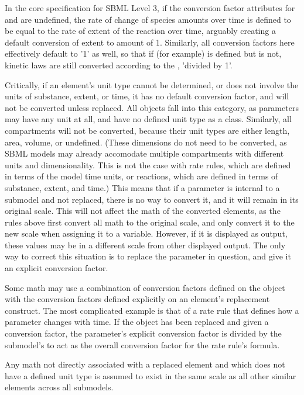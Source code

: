 In the core specification for SBML Level 3, if the conversion factor
attributes for \Model and \Species are undefined, the rate of change of
species amounts over time is defined to be equal to the rate of extent
of the reaction over time, arguably creating a default conversion of
extent to amount of 1.  Similarly, all conversion factors here
effectively default to '1' as well, so that if (for example)
 is defined but  is
not, kinetic laws are still
converted according to the , 'divided by 1'.

Critically, if an element's unit type cannot be determined, or does not
involve the units of substance, extent, or time, it has no
default conversion factor, and will not be converted unless replaced.
All \Parameter objects fall into this category, as
parameters may have any unit at all, and have no defined unit type as a
class.  Similarly, all compartments will not be converted, because their
unit types are either length, area, volume, or undefined.  (These dimensions
do not need to be converted, as SBML models may already accomodate multiple
compartments with different units and dimensionality.  This is not the case
with rate rules, which are defined in terms of the model time units, or
reactions, which are defined in terms of substance, extent, and time.)
This means that if a parameter is internal to
a submodel and not replaced, there is no way to convert it, and it will
remain in its original scale.  This will not affect the math of the
converted elements, as the rules above first convert all math to the
original scale, and only convert it to the new scale when assigning it
to a variable.  However, if it is displayed as output, these values may
be in a different scale from other displayed output.  The only way to
correct this situation is to replace the parameter in question, and give
it an explicit conversion factor.

Some math may use a combination of conversion factors defined on the
\Submodel object with the conversion factors defined explicitly on an
element's replacement construct.  The most complicated example is that of a rate
rule that defines how a parameter changes with time.  If the \Parameter
object has been replaced and given a conversion factor, the parameter's
explicit conversion factor is divided by the submodel's
 to act as the overall conversion factor for
the rate rule's formula.

Any math not directly associated with a replaced element and which does
not have a defined unit type is assumed to exist in the same scale as
all other similar elements across all submodels.  


